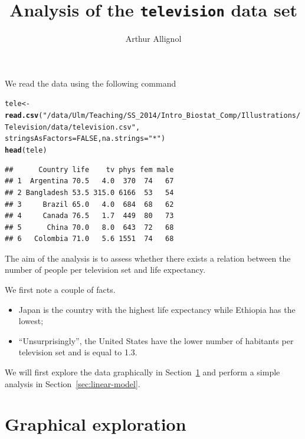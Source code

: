 \documentclass[12pt]{article}\usepackage[]{graphicx}\usepackage[]{color}
\title{Analysis of the {\tt television} data set}
\author{Arthur Allignol}
\date{}
\makeatletter
\newcommand{\hlnum}[1]{\textcolor[rgb]{0.686,0.059,0.569}{#1}}%
\newcommand{\hlstr}[1]{\textcolor[rgb]{0.192,0.494,0.8}{#1}}%
\newcommand{\hlstd}[1]{\textcolor[rgb]{0.345,0.345,0.345}{#1}}%
\newcommand{\hlkwb}[1]{\textcolor[rgb]{0.69,0.353,0.396}{#1}}%
\newcommand{\hlkwc}[1]{\textcolor[rgb]{0.333,0.667,0.333}{#1}}%
\newcommand{\hlkwd}[1]{\textcolor[rgb]{0.737,0.353,0.396}{\textbf{#1}}}%
\newenvironment{kframe}{%
 \def\at@end@of@kframe{}%
 \ifinner\ifhmode%
  \def\at@end@of@kframe{\end{minipage}}%
  \begin{minipage}{\columnwidth}%
 \fi\fi%
 \def\FrameCommand##1{\hskip\@totalleftmargin \hskip-\fboxsep
 \colorbox{shadecolor}{##1}\hskip-\fboxsep
     \hskip-\linewidth \hskip-\@totalleftmargin \hskip\columnwidth}%
 \MakeFramed {\advance\hsize-\width
   \@totalleftmargin\z@ \linewidth\hsize
   \@setminipage}}%
 {\par\unskip\endMakeFramed%
 \at@end@of@kframe}
\newenvironment{knitrout}{}{} %
\makeatother
\begin{document}
\maketitle

We read the data using the following command
\begin{knitrout}\scriptsize
{}\color{fgcolor}\begin{kframe}
\begin{alltt}
\hlstd{tele} \hlkwb{<-} \hlkwd{read.csv}\hlstd{(}\hlstr{"/data/Ulm/Teaching/SS_2014/Intro_Biostat_Comp/Illustrations/Television/data/television.csv"}\hlstd{,}
                 \hlkwc{stringsAsFactors} \hlstd{=} \hlnum{FALSE}\hlstd{,} \hlkwc{na.strings} \hlstd{=} \hlstr{"*"}\hlstd{)}
\hlkwd{head}\hlstd{(tele)}
\end{alltt}
\begin{verbatim}
##      Country life    tv phys fem male
## 1  Argentina 70.5   4.0  370  74   67
## 2 Bangladesh 53.5 315.0 6166  53   54
## 3     Brazil 65.0   4.0  684  68   62
## 4     Canada 76.5   1.7  449  80   73
## 5      China 70.0   8.0  643  72   68
## 6   Colombia 71.0   5.6 1551  74   68
\end{verbatim}
\end{kframe}
\end{knitrout}

\noindent 
The aim of the analysis is to assess whether there exists a relation
between the number of people per television set and life
expectancy. 

We first note a couple of facts.
\begin{itemize}
\item Japan is the country with
  the highest life expectancy while
  Ethiopia has the lowest;
\item ``Unsurprisingly'', the United States
  have the lower number of habitants per television set and is equal
  to 1.3.
\end{itemize}
We will first explore the data graphically in
Section~\ref{sec:graph-expl} and perform a simple analysis in
Section~\ref{sec:linear-model}. 

\section{Graphical exploration}\label{sec:graph-expl}
\end{document}
